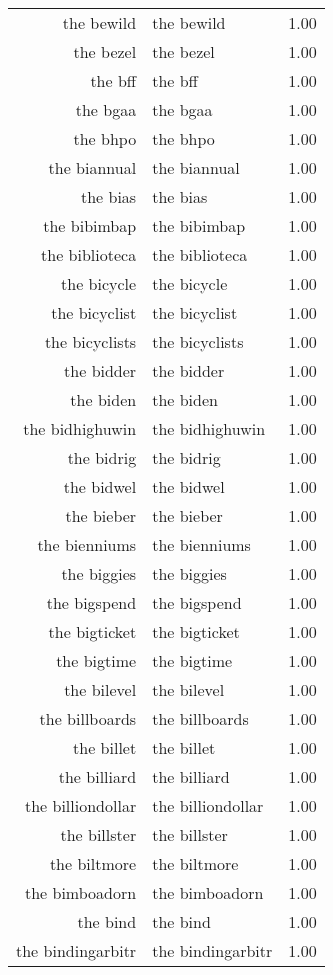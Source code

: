 \begin{table}[ht]
\begin{tabular}{rlr}
  the bewild & the bewild & 1.00 \\ 
  the bezel & the bezel & 1.00 \\ 
  the bff & the bff & 1.00 \\ 
  the bgaa & the bgaa & 1.00 \\ 
  the bhpo & the bhpo & 1.00 \\ 
  the biannual & the biannual & 1.00 \\ 
  the bias & the bias & 1.00 \\ 
  the bibimbap & the bibimbap & 1.00 \\ 
  the biblioteca & the biblioteca & 1.00 \\ 
  the bicycle & the bicycle & 1.00 \\ 
  the bicyclist & the bicyclist & 1.00 \\ 
  the bicyclists & the bicyclists & 1.00 \\ 
  the bidder & the bidder & 1.00 \\ 
  the biden & the biden & 1.00 \\ 
  the bidhighuwin & the bidhighuwin & 1.00 \\ 
  the bidrig & the bidrig & 1.00 \\ 
  the bidwel & the bidwel & 1.00 \\ 
  the bieber & the bieber & 1.00 \\ 
  the bienniums & the bienniums & 1.00 \\ 
  the biggies & the biggies & 1.00 \\ 
  the bigspend & the bigspend & 1.00 \\ 
  the bigticket & the bigticket & 1.00 \\ 
  the bigtime & the bigtime & 1.00 \\ 
  the bilevel & the bilevel & 1.00 \\ 
  the billboards & the billboards & 1.00 \\ 
  the billet & the billet & 1.00 \\ 
  the billiard & the billiard & 1.00 \\ 
  the billiondollar & the billiondollar & 1.00 \\ 
  the billster & the billster & 1.00 \\ 
  the biltmore & the biltmore & 1.00 \\ 
  the bimboadorn & the bimboadorn & 1.00 \\ 
  the bind & the bind & 1.00 \\ 
  the bindingarbitr & the bindingarbitr & 1.00 \\ 

\end{tabular}
\end{table}
